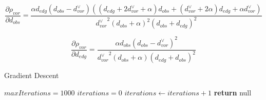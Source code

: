 \begin{equation}
\frac{\partial\rho_{vor}}{\partial d_{obs}} = \frac{\alpha d_{edg}\left(d_{obs}-d_{vor}^{\lor}\right)\left(\left(d_{edg}+2d_{vor}^{\lor}+\alpha\right) d_{obs}+\left(d_{vor}^{\lor}+2\alpha\right)d_{edg}+\alpha d_{vor}^{\lor}\right)}{{d_{vor}^{\lor}}^2\left(d_{obs}+\alpha\right)^2\left(d_{obs}+d_{edg}\right)^2}
\end{equation}

\begin{equation}
\frac{\partial\rho_{vor}}{\partial d_{edg}} =  \frac{\alpha d_{obs}\left(d_{obs}-d_{vor}^{\lor}\right)^2}{{d_{vor}^{\lor}}^2\left(d_{obs}+\alpha\right)\left(d_{edg}+d_{obs}\right)^2}
\end{equation}

\begin{algorithm}
    \caption{Gradient Descent}\label{alg:gradientDescent}
    \begin{algorithmic}[1]
    \State $maxIterations = 1000$
    \State $iterations = 0$
        \State $iterations \gets iterations + 1$
        \EndWhile
        \State \textbf{return} null
    \end{algorithmic}
\end{algorithm}
